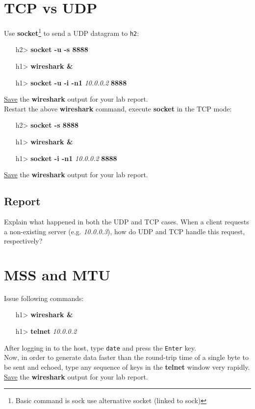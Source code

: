 \documentclass[10pt,a4paper]{article}
\numberwithin{equation}{section}
\numberwithin{figure}{section}
\numberwithin{table}{section}
\begin{document}
\section*{TCP vs UDP}
	Use \textbf{socket}\footnote{Basic command is sock use alternative socket (linked to sock)} to send a UDP datagram to \texttt{h2}: \\
	\begin{itemize}
		\item [h2>] \textbf{socket -u -s 8888}
		\item [h1>] \textbf{wireshark \&}
		\item [h1>] \textbf{socket -u -i -n1} \textit{10.0.0.2} \textbf{8888}
	\end{itemize}
    \underline{Save} the \textbf{wireshark} output for your lab report. \\
	Restart the above \textbf{wireshark} command, execute \textbf{socket} in the TCP mode: \\
	\begin{itemize}
		\item [h2>] \textbf{socket -s 8888}
		\item [h1>] \textbf{wireshark \&} \\
		\item [h1>] \textbf{socket -i -n1} \textit{10.0.0.2} \textbf{8888} \\
	\end{itemize}
    \underline{Save} the \textbf{wireshark} output for your lab report.
    \subsection*{Report}
    Explain what happened in both the UDP and TCP cases.
    When a client requests a non-existing server (e.g. \textit{10.0.0.3}), how do UDP and TCP handle this request, respectively?

\section*{MSS and MTU}
    Issue following commands:
    \begin{itemize}
        \item [h1>] \textbf{wireshark \&}
        \item [h1>] \textbf{telnet} \textit{10.0.0.2}
    \end{itemize}
    After logging in to the host, type \texttt{date} and press the \texttt{Enter} key. \\
    Now, in order to generate data faster than the round-trip time of a single byte to be sent and echoed, type any sequence of keys in the \textbf{telnet} window very rapidly. \\
    \underline{Save} the \textbf{wireshark} output for your lab report.
\end{document}

